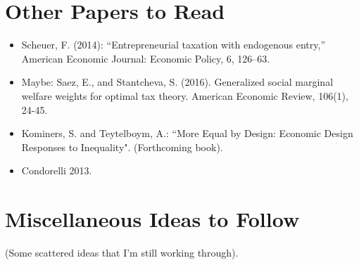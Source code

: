 \documentclass[JEL]{AEA}
\begin{document}
\section{Other Papers to Read}

\begin{itemize}
    \item Scheuer, F. (2014): “Entrepreneurial taxation with endogenous entry,” American Economic Journal: Economic Policy, 6, 126–63.
            
    \item Maybe: Saez, E., and Stantcheva, S. (2016). Generalized social marginal welfare weights for optimal tax theory. American Economic Review, 106(1), 24-45.
    
    \item Kominers, S. and Teytelboym, A.: ``More Equal by Design: Economic Design Responses to Inequality". (Forthcoming book).
    
    \item Condorelli 2013.
    
\end{itemize}

\section{Miscellaneous Ideas to Follow}

(Some scattered ideas that I'm still working through).
\end{document}
